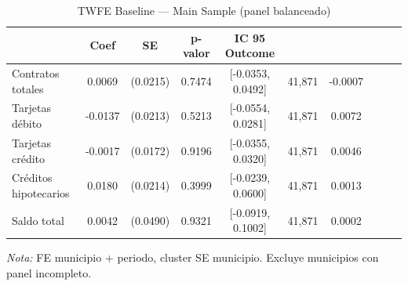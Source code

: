 \begin{table}[htbp]
\centering
\small
\caption{TWFE Baseline — Main Sample (panel balanceado)}
\label{tab:twfe_main}
\begin{tabular}{lcccccc}
\toprule
 & Coef & SE & p-valor & IC 95%
Outcome &  &  &  &  &  &  \\
\midrule
Contratos totales & 0.0069 & (0.0215) & 0.7474 & [-0.0353, 0.0492] & 41,871 & -0.0007 \\
Tarjetas débito & -0.0137 & (0.0213) & 0.5213 & [-0.0554, 0.0281] & 41,871 & 0.0072 \\
Tarjetas crédito & -0.0017 & (0.0172) & 0.9196 & [-0.0355, 0.0320] & 41,871 & 0.0046 \\
Créditos hipotecarios & 0.0180 & (0.0214) & 0.3999 & [-0.0239, 0.0600] & 41,871 & 0.0013 \\
Saldo total & 0.0042 & (0.0490) & 0.9321 & [-0.0919, 0.1002] & 41,871 & 0.0002 \\
\bottomrule
\end{tabular}
\vspace{2mm}
\parbox{\textwidth}{\footnotesize \textit{Nota:} FE municipio + periodo, cluster SE municipio. Excluye municipios con panel incompleto.}
\end{table}